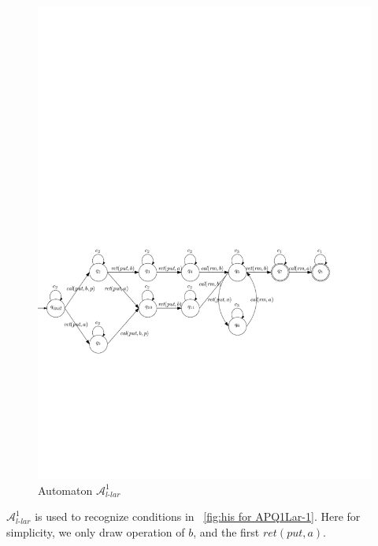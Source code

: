 \begin{figure}[htbp]
  \centering
  \includegraphics[width=1 \textwidth]{figures/PIC_AUTO_PQ1Lar-pprr.pdf}
  \caption{Automaton $\mathcal{A}_{\textit{l-lar}}^1$}
  \label{fig:automata APQ1Lar-1}
\end{figure}

$\mathcal{A}_{\textit{l-lar}}^1$ is used to recognize conditions in \figurename~\ref{fig:his for APQ1Lar-1}. Here for simplicity, we only draw operation of $b$, and the first $\textit{ret}(\textit{put},a)$.


